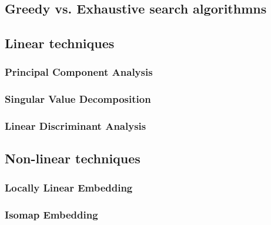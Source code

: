 


\subsection{Greedy vs. Exhaustive search algorithmns}

\subsection{Linear techniques}

\subsubsection{Principal Component Analysis}
\subsubsection{Singular Value Decomposition}
\subsubsection{Linear Discriminant Analysis}

\subsection{Non-linear techniques}

\subsubsection{Locally Linear Embedding}
\subsubsection{Isomap Embedding}
